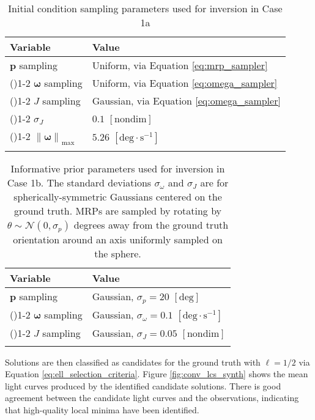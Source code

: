 \documentclass[a4paper,twocolumn]{spaceDebrisC} %
\newcommand{\grule}[0]{\arrayrulecolor{darkgray}\cmidrule(){1-2}}
\newcommand{\brule}[0]{\arrayrulecolor{black} \bottomrule}
\newcommand{\vctr}[1]{\bm{#1}}
\newcommand{\norm}[1]{\left\lVert#1\right\rVert}
\begin{document}
\begin{table}[H]
  \centering
  \renewcommand{\arraystretch}{1.3} %
  \caption{Initial condition sampling parameters used for inversion in Case 1a}
  \vspace*{6pt}
  \begin{tabular}{@{} l l @{}}
    \toprule
    Variable & Value \\ \midrule
    $\vctr{p}$ sampling & Uniform, via Equation \ref{eq:mrp_sampler} \\ \grule
    $\vctr{\omega}$ sampling & Uniform, via Equation \ref{eq:omega_sampler} \\ \grule
    $J$ sampling & Gaussian, via Equation \ref{eq:omega_sampler} \\ \grule
    $\sigma_J$ & $0.1$ $[\text{nondim}]$ \\ \grule
    $\norm{\vctr{\omega}}_\text{max}$ & $5.26$ $[\text{deg}\cdot \text{s}^{-1}]$ \\ \brule
  \end{tabular}
  \label{tb:case1a_prior}
\end{table}


\begin{table}[H]
  \centering
  \renewcommand{\arraystretch}{1.3} %
  \caption{Informative prior parameters used for inversion in Case 1b. The standard deviations $\sigma_\omega$ and $\sigma_J$ are for spherically-symmetric Gaussians centered on the ground truth. MRPs are sampled by rotating by $\theta\sim \mathcal{N}(0,\sigma_p)$ degrees away from the ground truth orientation around an axis uniformly sampled on the sphere.}
  \vspace*{6pt}
  \begin{tabular}{@{} l l @{}}
    \toprule
    Variable & Value \\ \midrule
    $\vctr{p}$ sampling & Gaussian, $\sigma_p=20$ $[\text{deg}]$ \\ \grule
    $\vctr{\omega}$ sampling & Gaussian, $\sigma_\omega = 0.1$ $[\text{deg}\cdot\text{s}^{-1}]$ \\ \grule
    $J$ sampling & Gaussian, $\sigma_J = 0.05$ $[\text{nondim}]$ \\ \brule
  \end{tabular}
  \label{tb:case1b_prior}
\end{table}

Solutions are then classified as candidates for the ground truth with $\ell = 1/2$ via Equation \ref{eq:ell_selection_criteria}. Figure \ref{fig:conv_lcs_synth} shows the mean light curves produced by the identified candidate solutions. There is good agreement between the candidate light curves and the observations, indicating that high-quality local minima have been identified.
\end{document}
